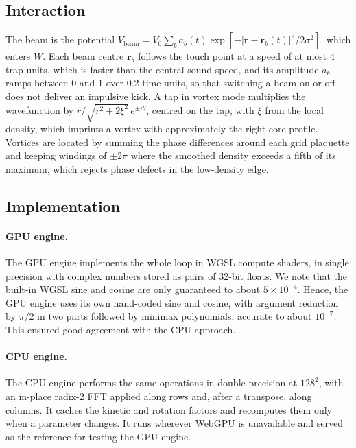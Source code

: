 \documentclass[11pt,a4paper]{article}
\begin{document}
\subsection{Interaction}

The beam is the potential $V_{\mathrm{beam}}=V_0\sum_b a_b(t)\exp[-|\mathbf r-\mathbf r_b(t)|^2/2\sigma^2]$, which enters $W$. Each beam centre $\mathbf r_b$ follows the touch point at a speed of at most 4 trap units, which is faster than the central sound speed, and its amplitude $a_b$ ramps between 0 and 1 over 0.2 time units, so that switching a beam on or off does not deliver an impulsive kick. A tap in vortex mode multiplies the wavefunction by $r/\sqrt{r^2+2\xi^2}\,e^{\pm i\theta}$, centred on the tap, with $\xi$ from the local density, which imprints a vortex with approximately the right core profile. Vortices are located by summing the phase differences around each grid plaquette and keeping windings of $\pm2\pi$ where the smoothed density exceeds a fifth of its maximum, which rejects phase defects in the low-density edge.

\subsection{Implementation}

\paragraph{GPU engine.} The GPU engine implements the whole loop in WGSL compute shaders, in single precision with complex numbers stored as pairs of 32-bit floats. We note that the built-in WGSL sine and cosine are only guaranteed to about $5\times10^{-4}$. Hence, the GPU engine uses its own hand-coded sine and cosine, with argument reduction by $\pi/2$ in two parts followed by minimax polynomials, accurate to about $10^{-7}$. This ensured good agreement with the CPU approach.

\paragraph{CPU engine.} The CPU engine performs the same operations in double precision at $128^2$, with an in-place radix-2 FFT applied along rows and, after a transpose, along columns. It caches the kinetic and rotation factors and recomputes them only when a parameter changes. It runs wherever WebGPU is unavailable and served as the reference for testing the GPU engine.
\end{document}
